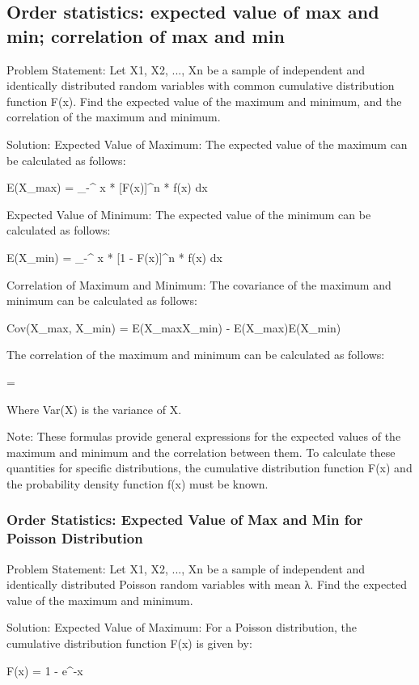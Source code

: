 \documentclass[12pt, a4paper, oneside]{article}
\begin{document}
\subsection{ Order statistics: expected value of max and min; correlation of max and min }
Problem Statement:
Let X1, X2, ..., Xn be a sample of independent and identically distributed random variables with common cumulative distribution function F(x). Find the expected value of the maximum and minimum, and the correlation of the maximum and minimum.

Solution:
Expected Value of Maximum:
The expected value of the maximum can be calculated as follows:

E(X_{max}) = \int_{-\infty}^{\infty} x * [F(x)]^{n} * f(x) dx

Expected Value of Minimum:
The expected value of the minimum can be calculated as follows:

E(X_{min}) = \int_{-\infty}^{\infty} x * [1 - F(x)]^{n} * f(x) dx

Correlation of Maximum and Minimum:
The covariance of the maximum and minimum can be calculated as follows:

Cov(X_{max}, X_{min}) = E(X_{max}X_{min}) - E(X_{max})E(X_{min})

The correlation of the maximum and minimum can be calculated as follows:

\rho = 

Where Var(X) is the variance of X.

Note: These formulas provide general expressions for the expected values of the maximum and minimum and the correlation between them. To calculate these quantities for specific distributions, the cumulative distribution function F(x) and the probability density function f(x) must be known.

\subsubsection{Order Statistics: Expected Value of Max and Min for Poisson Distribution}
Problem Statement:
Let X1, X2, ..., Xn be a sample of independent and identically distributed Poisson random variables with mean λ. Find the expected value of the maximum and minimum.

Solution:
Expected Value of Maximum:
For a Poisson distribution, the cumulative distribution function F(x) is given by:

F(x) = 1 - e^{-\lambda x}
\end{document}

